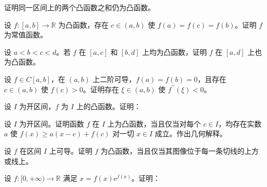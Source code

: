 \newpage
\noindent\begin{minipage}{\textwidth}
证明同一区间上的两个凸函数之和仍为凸函数。
\end{minipage}\par\vfill
\noindent\begin{minipage}{\textwidth}
设 $f:[a,b]\to\mathbb R$ 为凸函数，存在 $c\in(a,b)$ 使 $f(a)=f(c)=f(b)$。证明 $f$ 为常值函数。
\end{minipage}\par\vfill
\noindent\begin{minipage}{\textwidth}
设 $a<b<c<d$。若 $f$ 在 $[a,c]$ 和 $[b,d]$ 上均为凸函数，证明 $f$ 在 $[a,d]$ 上也为凸函数。
\end{minipage}\par\vfill
\newpage
\noindent\begin{minipage}{\textwidth}
设 $f\in C[a,b]$，在 $(a,b)$ 上二阶可导，$f(a)=f(b)=0$，且存在 $c\in(a,b)$ 使 $f(c)>0$。证明存在 $\xi\in(a,b)$ 使 $f^{\prime\prime}(\xi)<0$。
\end{minipage}\par\vfill
\noindent\begin{minipage}{\textwidth}
设 $I$ 为开区间，$f$ 为 $I$ 上的凸函数。证明：
\end{minipage}\par\vfill
\noindent\begin{minipage}{\textwidth}
设 $I$ 为开区间。证明函数 $f$ 在 $I$ 上为凸函数，当且仅当对每个 $c\in I$，均存在实数 $a$ 使 $f(x)\ge a(x-c)+f(c)$ 对一切 $x\in I$ 成立。作出几何解释。
\end{minipage}\par\vfill
\newpage
\noindent\begin{minipage}{\textwidth}
设 $f$ 在区间 $I$ 上可导。证明 $f$ 为凸函数，当且仅当其图像位于每一条切线的上方或线上。
\end{minipage}\par\vfill
\noindent\begin{minipage}{\textwidth}
设 $f:[0,+\infty)\to\mathbb R$ 满足 $x=f(x)\mathrm e^{f(x)}$。证明：
\end{minipage}\par\vfill
